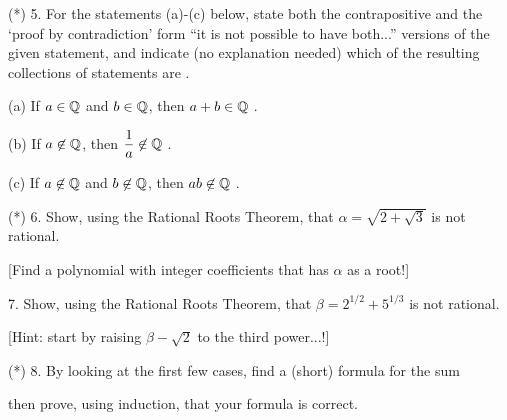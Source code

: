 \documentclass[12pt]{article}
\begin{document}
\begin{description}

\item{(*) 5.} For the statements (a)-(c) below, state both the 
contrapositive and the `proof by contradiction' form ``it is not possible to have both...'' 
versions of the given statement, and indicate (no explanation needed) 
which of the resulting collections of statements are . 

\ssk

\item{\spc} (a) If $a\in{\mathbb Q}$ and $b\in{\mathbb Q}$, then $a+b\in{\mathbb Q}$ .

\ssk

\item{\spc} (b) If $a\not\in{\mathbb Q}$, then $\displaystyle {{1}\over{a}}\not\in{\mathbb Q}$ .

\ssk

\item{\spc} (c) If $a\not\in{\mathbb Q}$ and $b\not\in{\mathbb Q}$, then $ab\not\in{\mathbb Q}$ .

\msk

\item{(*) 6.} Show, using the Rational Roots Theorem, that $\alpha = \sqrt{2+\sqrt{3}}$ is not rational.

\ssk

\item{\spc} [Find a polynomial with integer coefficients that has $\alpha$ as a root!]

\msk

\item{7.} Show, using the Rational Roots Theorem, that $\beta = 2^{1/2}+5^{1/3}$ is not rational.

\ssk

\item{\spc} [Hint: start by raising $\beta-\sqrt{2}$ to the third power...!]

\msk

\item{(*) 8.} By looking at the first few cases, find a (short)
formula for the sum

\ssk


\ssk

\item{\spc} then prove, using induction, that your formula is correct.

\msk


\end{description}
\end{document}
